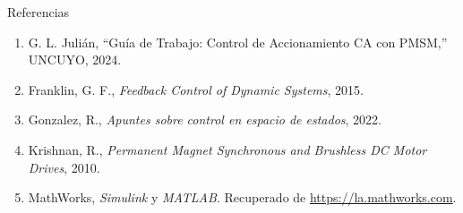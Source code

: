 \documentclass[12pt]{beamer}
\begin{document}
\begin{frame}{Referencias}
\begin{enumerate}
    \item G. L. Julián, “Guía de Trabajo: Control de Accionamiento CA con PMSM,” UNCUYO, 2024.
    \item Franklin, G. F., \textit{Feedback Control of Dynamic Systems}, 2015.
    \item Gonzalez, R., \textit{Apuntes sobre control en espacio de estados}, 2022.
    \item Krishnan, R., \textit{Permanent Magnet Synchronous and Brushless DC Motor Drives}, 2010.
    \item MathWorks, \textit{Simulink} y \textit{MATLAB}. Recuperado de \url{https://la.mathworks.com}.
\end{enumerate}
\end{frame}
\end{document}
